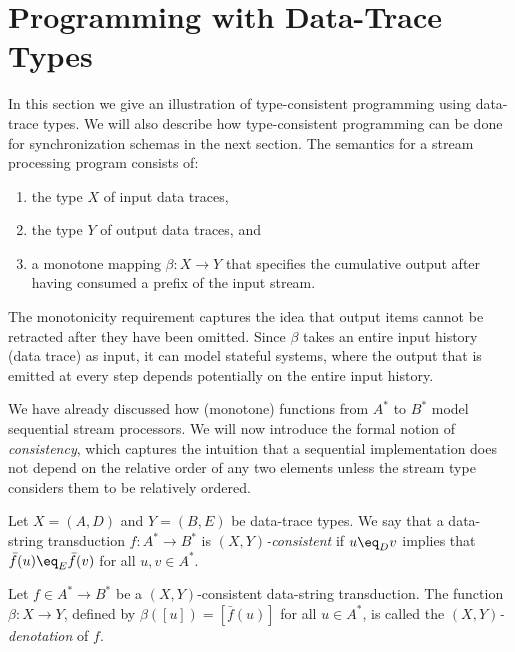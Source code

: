 \section{Programming with Data-Trace Types}
\label{subsec:dtt-2}

In this section we give an illustration of type-consistent programming
using data-trace types.
We will also describe how type-consistent programming can be done for
synchronization schemas in the next section.
The semantics for a stream processing program consists of:
\begin{enumerate}
\item
the type $X$ of input data traces,
\item
the type $Y$ of output data traces, and
\item
a monotone mapping $\beta: X \to Y$ that specifies the cumulative output after having consumed a prefix of the input stream.
\end{enumerate}
The monotonicity requirement captures the idea that output items cannot be retracted after they have been omitted. Since $\beta$ takes an entire input history (data trace) as input, it can model stateful systems, where the output that is emitted at every step depends potentially on the entire input history.

We have already discussed how (monotone) functions from $A^*$ to $B^*$ model sequential stream processors. We will now introduce the formal notion of \emph{consistency}, which captures the intuition that a sequential implementation does not depend on the relative order of any two elements unless the stream type considers them to be relatively ordered.

\begin{definition}[Consistency]
Let $X = (A,D)$ and $Y = (B,E)$ be data-trace types. We say that a data-string transduction $f: A^* \to B^*$
is \emph{$(X,Y)$-consistent} if $u \eq_D v$ implies that $\bar{f}(u) \eq_{E} \bar{f}(v)$ for all $u, v \in A^*$.

Let $f \in A^* \to B^*$ be a $(X,Y)$-consistent data-string transduction. The function $\beta: X \to Y$, defined by
$\beta([u]) = [\bar f(u)]$ for all $u \in A^*$, is called the \emph{$(X,Y)$-denotation} of $f$.
\end{definition}

